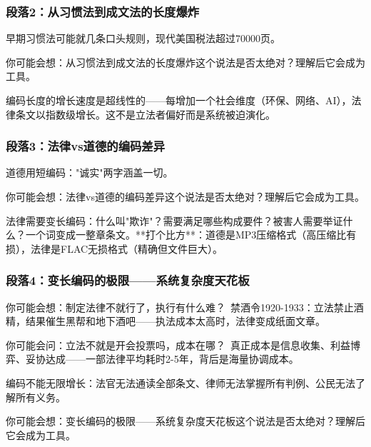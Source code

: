 \documentclass[a4paper,12pt]{book}
\newenvironment{motivation}{\begin{tcolorbox}[colback=gray!10,colframe=gray!60,title=\textit{本章动机 (Motivation)},fonttitle=\bfseries,arc=0mm,leftrule=3mm]\small\itshape}{\end{tcolorbox}}
\begin{document}
\begin{motivation}
\begin{motivation}
\begin{motivation}
	\subsubsection*{段落2：从习惯法到成文法的长度爆炸}
	早期习惯法可能就几条口头规则，现代美国税法超过70000页。
	\begin{tcolorbox}[colback=yellow!5, title=\textit{读者行为预测}]
		你可能会想：从习惯法到成文法的长度爆炸这个说法是否太绝对？理解后它会成为工具。
	\end{tcolorbox}

编码长度的增长速度是超线性的——每增加一个社会维度（环保、网络、AI），法律条文以指数级增长。这不是立法者偏好而是系统被迫演化。

	\subsubsection*{段落3：法律vs道德的编码差异}
	道德用短编码："诚实"两字涵盖一切。
	\begin{tcolorbox}[colback=yellow!5, title=\textit{读者行为预测}]
		你可能会想：法律vs道德的编码差异这个说法是否太绝对？理解后它会成为工具。
	\end{tcolorbox}

法律需要变长编码：什么叫"欺诈"？需要满足哪些构成要件？被害人需要举证什么？一个词变成一整章条文。**打个比方**：道德是MP3压缩格式（高压缩比有损），法律是FLAC无损格式（精确但文件巨大）。

	\subsubsection*{段落4：变长编码的极限——系统复杂度天花板}

	\begin{tcolorbox}[colback=yellow!5, title=\textit{读者行为预测}]
		你可能会想：制定法律不就行了，执行有什么难？\ 禁酒令1920-1933：立法禁止酒精，结果催生黑帮和地下酒吧——执法成本太高时，法律变成纸面文章。
	\end{tcolorbox}


	\begin{tcolorbox}[colback=yellow!5, title=\textit{读者行为预测}]
		你可能会问：立法不就是开会投票吗，成本在哪？\ 真正成本是信息收集、利益博弈、妥协达成——一部法律平均耗时2-5年，背后是海量协调成本。
	\end{tcolorbox}

	编码不能无限增长：法官无法通读全部条文、律师无法掌握所有判例、公民无法了解所有义务。
	\begin{tcolorbox}[colback=yellow!5, title=\textit{读者行为预测}]
		你可能会想：变长编码的极限——系统复杂度天花板这个说法是否太绝对？理解后它会成为工具。
	\end{tcolorbox}


\end{motivation}
\end{motivation}
\end{motivation}
\end{document}
